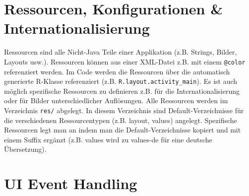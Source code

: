 \section{Ressourcen, Konfigurationen \& Internationalisierung}

Ressourcen sind alle Nicht-Java Teile einer Applikation (z.B. Strings, Bilder, Layouts usw.). Ressourcen können aus einer XML-Datei z.B. mit einem \texttt{@color} referenziert werden. Im Code werden die Ressourcen über die automatisch generierte R-Klasse referenziert (z.B. \texttt{R.layout.activity\_main}). Es ist auch möglich spezifische Ressourcen zu definieren z.B. für die Internationalisierung oder für Bilder unterschiedlicher Auflösungen.
Alle Ressourcen werden im Verzeichnis \texttt{res/} abgelegt. In diesem Verzeichnis sind Default-Verzeichnisse für die verschiedenen Ressourcentypen (z.B. layout, values) angelegt. Spezifische Ressourcen legt man an indem man die Default-Verzeichnisse kopiert und mit einem Suffix ergänzt (z.B. values wird zu values-de für eine deutsche Übersetzung).

\section{UI Event Handling}

